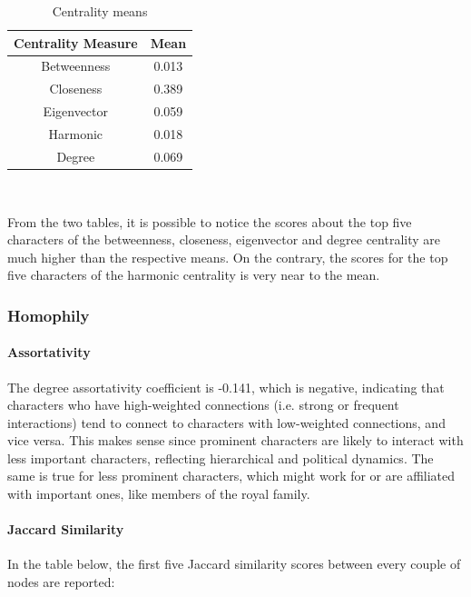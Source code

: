 \documentclass[10pt,twocolumn,letterpaper]{article}
\begin{document}
\begin{table}[]
    \centering
    \begin{tabular}{c|c}
        Centrality Measure & Mean  \\
        \hline
        Betweenness & 0.013 \\
        Closeness & 0.389 \\
        Eigenvector & 0.059 \\
        Harmonic & 0.018 \\
        Degree & 0.069 \\
        \hline 
    \end{tabular} \\
    \caption{Centrality means}
    \label{tab:my_label}
\end{table}

From the two tables, it is possible to notice the scores about the top five characters of the betweenness, closeness, eigenvector and degree centrality are much higher than the respective means. On
the contrary, the scores for the top five characters of the harmonic centrality is very near to the mean.

\subsubsection{Homophily}



\paragraph{Assortativity}

The degree assortativity coefficient is -0.141, which is negative, indicating that characters who have high-weighted connections (i.e. strong or frequent interactions) tend to connect to characters with low-weighted connections, and vice versa. This makes sense since prominent characters are likely to interact with less important characters, reflecting hierarchical and political dynamics. The same is true for less prominent characters, which might work for or are affiliated with important ones, like members of the royal family.

\paragraph{Jaccard Similarity}

In the table below, the first five Jaccard similarity scores between every couple of nodes are reported: \\
\end{document}
